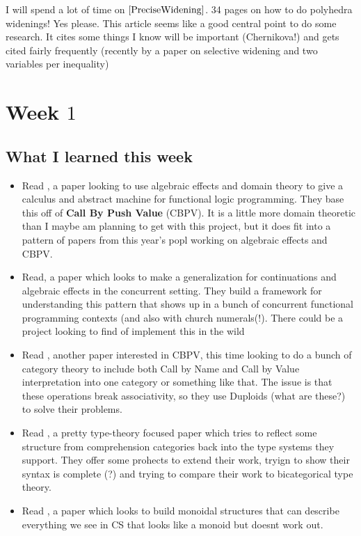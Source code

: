\documentclass{amsart}
\begin{document}
I will spend a lot of time on $\cite{PreciseWidening}$. 
34 pages on how to do polyhedra widenings! Yes please. 
This article seems like a good central point to do some research. 
It cites some things I know will be important (Chernikova!) and gets cited fairly frequently (recently by a paper on selective widening and two variables per inequality)

\section{Week $1$}

\subsection{What I learned this week}
\begin{itemize}
  \item Read \cite{DomainTheory}, a paper looking to use algebraic effects and domain theory to give a calculus and abstract machine for functional logic programming. 
They base this off of \textbf{Call By Push Value} (CBPV). 
It is a little more domain theoretic than I maybe am planning to get with this project, but it does fit into a pattern of papers from this year's popl working on algebraic effects and CBPV.
  \item 
Read\cite{Hyperfunctions}, a paper which looks to make a generalization for continuations and algebraic effects in the concurrent setting. 
They build a framework for understanding this pattern that shows up in a bunch of concurrent functional programming contexts (and also with church numerals(!). 
There could be a project looking to find of implement this in the wild
  \item 
Read \cite{Hasegawa-Thielecke}, another paper interested in CBPV, this time looking to do a bunch of category theory to include both Call by Name and Call by Value interpretation into one category or something like that.
The issue is that these operations break associativity, so they use Duploids (what are these?) to solve their problems.
  \item 
Read \cite{SemanticsToSyntax}, a pretty type-theory focused paper which tries to reflect some structure from comprehension categories back into the type systems they support.
They offer some prohects to extend their work, tryign to show their syntax is complete (?) and trying to compare their work to bicategorical type theory.
  \item 
Read \cite{WhatIsMonoid}, a paper which looks to build monoidal structures that can describe everything we see in CS that looks like a monoid but doesnt work out.

\end{itemize}
\end{document}
